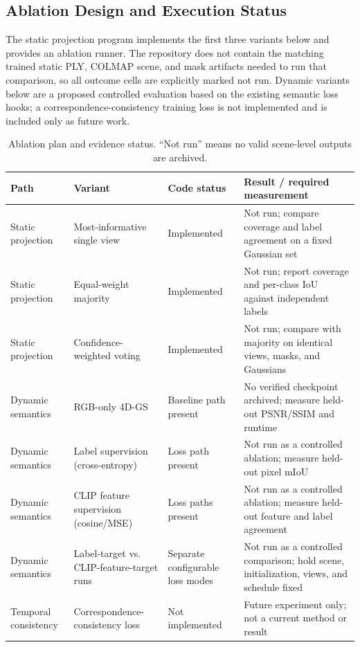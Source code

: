 \documentclass[conference]{IEEEtran}
\begin{document}
\subsection{Ablation Design and Execution Status}
The static projection program implements the first three variants below and provides an ablation runner. The repository does not contain the matching trained static PLY, COLMAP scene, and mask artifacts needed to run that comparison, so all outcome cells are explicitly marked not run. Dynamic variants below are a proposed controlled evaluation based on the existing semantic loss hooks; a correspondence-consistency training loss is not implemented and is included only as future work.

\begin{table}[t]
\caption{Ablation plan and evidence status. ``Not run'' means no valid scene-level outputs are archived.}
\label{tab:ablations}
\centering
\footnotesize
\begin{tabularx}{\textwidth}{p{}p{}p{}X}
\toprule
Path & Variant & Code status & Result / required measurement \\
\midrule
Static projection & Most-informative single view & Implemented & Not run; compare coverage and label agreement on a fixed Gaussian set \\
Static projection & Equal-weight majority & Implemented & Not run; report coverage and per-class IoU against independent labels \\
Static projection & Confidence-weighted voting & Implemented & Not run; compare with majority on identical views, masks, and Gaussians \\
Dynamic semantics & RGB-only 4D-GS & Baseline path present & No verified checkpoint archived; measure held-out PSNR/SSIM and runtime \\
Dynamic semantics & Label supervision (cross-entropy) & Loss path present & Not run as a controlled ablation; measure held-out pixel mIoU \\
Dynamic semantics & CLIP feature supervision (cosine/MSE) & Loss paths present & Not run as a controlled ablation; measure held-out feature and label agreement \\
Dynamic semantics & Label-target vs. CLIP-feature-target runs & Separate configurable loss modes & Not run as a controlled comparison; hold scene, initialization, views, and schedule fixed \\
Temporal consistency & Correspondence-consistency loss & Not implemented & Future experiment only; not a current method or result \\
\bottomrule
\end{tabularx}
\end{table}
\end{document}
